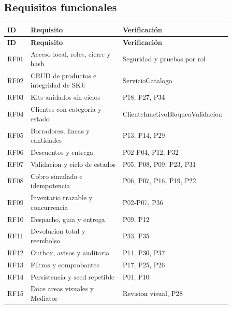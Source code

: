 \subsection{Requisitos funcionales}
\begingroup\small
\begin{longtable}{@{}>{\raggedright\arraybackslash}p{0.09\linewidth}>{\raggedright\arraybackslash}p{0.4\linewidth}>{\raggedright\arraybackslash}p{0.43\linewidth}@{}}
\toprule
\textbf{ID} & \textbf{Requisito} & \textbf{Verificación}\\
\midrule
\endfirsthead
\toprule
\textbf{ID} & \textbf{Requisito} & \textbf{Verificación}\\
\midrule
\endhead
RF01 & Acceso local, roles, cierre y hash & Seguridad y pruebas por rol\\[3pt]
RF02 & CRUD de productos e integridad de SKU & ServicioCatalogo\\[3pt]
RF03 & Kits anidados sin ciclos & P18, P27, P34\\[3pt]
RF04 & Clientes con categoria y estado & ClienteInactivoBloqueaValidacion\\[3pt]
RF05 & Borradores, lineas y cantidades & P13, P14, P29\\[3pt]
RF06 & Descuentos y entrega & P02-P04, P12, P32\\[3pt]
RF07 & Validacion y ciclo de estados & P05, P08, P09, P23, P31\\[3pt]
RF08 & Cobro simulado e idempotencia & P06, P07, P16, P19, P22\\[3pt]
RF09 & Inventario trazable y concurrencia & P02-P07, P36\\[3pt]
RF10 & Despacho, guia y entrega & P09, P12\\[3pt]
RF11 & Devolucion total y reembolso & P33, P35\\[3pt]
RF12 & Outbox, avisos y auditoria & P11, P30, P37\\[3pt]
RF13 & Filtros y comprobantes & P17, P25, P26\\[3pt]
RF14 & Persistencia y seed repetible & P01, P10\\[3pt]
RF15 & Doce areas visuales y Mediator & Revision visual, P28\\[3pt]
\bottomrule
\end{longtable}
\endgroup

